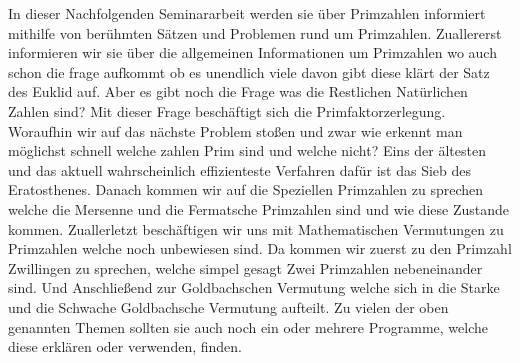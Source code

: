 In dieser Nachfolgenden Seminararbeit werden sie über Primzahlen informiert mithilfe von
berühmten Sätzen und Problemen rund um Primzahlen. Zuallererst informieren wir sie über die allgemeinen Informationen um Primzahlen wo auch schon die frage aufkommt ob es unendlich viele davon gibt diese klärt der Satz des Euklid auf. Aber es gibt noch die Frage was die Restlichen Natürlichen Zahlen sind? Mit dieser Frage beschäftigt sich die Primfaktorzerlegung. Woraufhin wir auf das nächste Problem stoßen und zwar wie erkennt man möglichst schnell welche zahlen Prim sind und welche nicht? Eins der ältesten und das aktuell wahrscheinlich effizienteste Verfahren dafür ist das Sieb des Eratosthenes.
Danach kommen wir auf die Speziellen Primzahlen zu sprechen welche die Mersenne und die Fermatsche Primzahlen sind und wie diese Zustande kommen. Zuallerletzt beschäftigen wir uns mit Mathematischen Vermutungen zu Primzahlen welche noch unbewiesen sind. Da kommen wir zuerst zu den Primzahl Zwillingen zu sprechen, welche simpel gesagt Zwei Primzahlen nebeneinander sind. Und Anschließend zur Goldbachschen Vermutung welche sich in die Starke und die Schwache Goldbachsche Vermutung aufteilt. Zu vielen der oben genannten Themen sollten sie auch noch ein oder mehrere Programme, welche diese erklären oder verwenden, finden. 